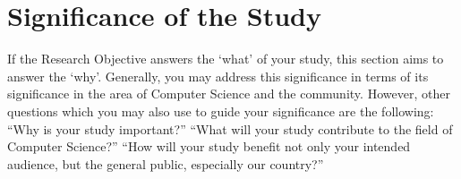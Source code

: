\section{Significance of the Study}


If the Research Objective answers the ‘what’ of your study, this section aims to answer the ‘why’. Generally, you may address this significance in terms of its significance in the area of Computer Science and the community. However, other questions which you may also use to guide your significance are the following: “Why is your study important?” “What will your study contribute to the field of Computer Science?” “How will your study benefit not only your intended audience, but the general public, especially our country?”